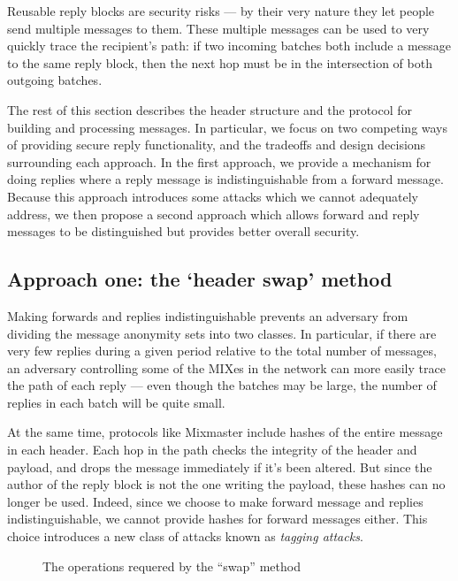 \documentclass{llncs}
\begin{document}
Reusable reply blocks are security risks --- by their very nature they
let people send multiple messages to them. These multiple messages can be
used to very quickly trace the recipient's path: if two incoming batches
both include a message to the same reply block, then the next hop must
be in the intersection of both outgoing batches.


The rest of this section describes the header structure and the
protocol for building and processing messages. In particular, we
focus on two competing ways of providing secure reply functionality,
and the tradeoffs and design decisions surrounding each approach. In
the first approach, we provide a mechanism for doing replies where a
reply message is indistinguishable from a forward message. Because this
approach introduces some attacks which we cannot adequately address, we
then propose a second approach which allows forward and reply messages
to be distinguished but provides better overall security.


\subsection{Approach one: the `header swap' method}

Making forwards and replies indistinguishable prevents an adversary from
dividing the message anonymity sets into two classes. In particular, if
there are very few replies during a given period relative to the total
number of messages, an adversary controlling some of the MIXes in the
network can more easily trace the path of each reply --- even though
the batches may be large, the number of replies in each batch will be
quite small.

At the same time, protocols like Mixmaster include hashes of the entire
message in each header. Each hop in the path checks the integrity of
the header and payload, and drops the message immediately if it's been
altered. But since the author of the reply block is not the one writing
the payload, these hashes can no longer be used. Indeed, since we choose
to make forward message and replies indistinguishable, we cannot provide
hashes for forward messages either. This choice introduces a new class
of attacks known as \emph{tagging attacks}.

\begin{figure}
\begin{center}
\caption{The operations requered by the ``swap'' method} 
\end{center}
\end{figure}
\end{document}
